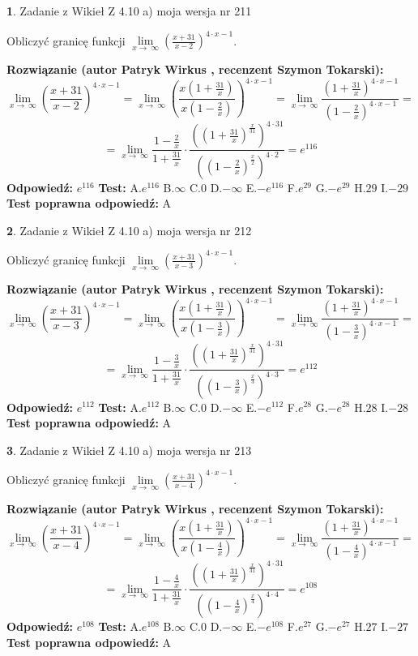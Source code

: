 \documentclass[12pt, a4paper]{article}
\theoremstyle{definition} %
\newtheorem{zad}{}
\newcommand{\zadStart}[1]{\begin{zad}#1\newline}
\newcommand{\zadStop}{\end{zad}}
\newcommand{\rozwStart}[2]{\noindent \textbf{Rozwiązanie (autor #1 , recenzent #2): }\newline}
\newcommand{\rozwStop}{\newline}
\newcommand{\odpStart}{\noindent \textbf{Odpowiedź:}\newline}
\newcommand{\odpStop}{\newline}
\newcommand{\testStart}{\noindent \textbf{Test:}\newline}
\newcommand{\testStop}{\newline}
\newcommand{\kluczStart}{\noindent \textbf{Test poprawna odpowiedź:}\newline}
\newcommand{\kluczStop}{\newline}
\begin{document}
\zadStart{Zadanie z Wikieł Z 4.10 a) moja wersja nr 211}

Obliczyć granicę funkcji  $\lim\limits_{x\to\ \infty}(\frac{x+31}{x-2})^{4\cdot x-1}$.
\zadStop
\rozwStart{Patryk Wirkus}{Szymon Tokarski}
$$\lim\limits_{x\to\ \infty}(\frac{x+31}{x-2})^{4\cdot x-1} = \lim\limits_{x\to\ \infty}(\frac{x(1+\frac{31}{x})}{x(1-\frac{2}{x})})^{4\cdot x-1}=\lim\limits_{x\to\ \infty}\frac{(1+\frac{31}{x})^{4\cdot x-1}}{(1-\frac{2}{x})^{4\cdot x-1}}=$$
$$=\lim\limits_{x\to\ \infty}\frac{1-\frac{2}{x}}{1+\frac{31}{x}}\cdot\frac{((1+\frac{31}{x})^{\frac{x}{31}})^{4\cdot31}}{((1-\frac{2}{x})^{\frac{x}{2}})^{4\cdot2}}=e^{116}$$
\rozwStop
\odpStart
$e^{116}$
\odpStop
\testStart
A.$e^{116}$ B.$\infty$ C.$0$ D.$-\infty$ E.$-e^{116}$
F.$e^{29}$ G.$-e^{29}$
H.$29$
I.$-29$
\testStop
\kluczStart
A
\kluczStop



\zadStart{Zadanie z Wikieł Z 4.10 a) moja wersja nr 212}

Obliczyć granicę funkcji  $\lim\limits_{x\to\ \infty}(\frac{x+31}{x-3})^{4\cdot x-1}$.
\zadStop
\rozwStart{Patryk Wirkus}{Szymon Tokarski}
$$\lim\limits_{x\to\ \infty}(\frac{x+31}{x-3})^{4\cdot x-1} = \lim\limits_{x\to\ \infty}(\frac{x(1+\frac{31}{x})}{x(1-\frac{3}{x})})^{4\cdot x-1}=\lim\limits_{x\to\ \infty}\frac{(1+\frac{31}{x})^{4\cdot x-1}}{(1-\frac{3}{x})^{4\cdot x-1}}=$$
$$=\lim\limits_{x\to\ \infty}\frac{1-\frac{3}{x}}{1+\frac{31}{x}}\cdot\frac{((1+\frac{31}{x})^{\frac{x}{31}})^{4\cdot31}}{((1-\frac{3}{x})^{\frac{x}{3}})^{4\cdot3}}=e^{112}$$
\rozwStop
\odpStart
$e^{112}$
\odpStop
\testStart
A.$e^{112}$ B.$\infty$ C.$0$ D.$-\infty$ E.$-e^{112}$
F.$e^{28}$ G.$-e^{28}$
H.$28$
I.$-28$
\testStop
\kluczStart
A
\kluczStop



\zadStart{Zadanie z Wikieł Z 4.10 a) moja wersja nr 213}

Obliczyć granicę funkcji  $\lim\limits_{x\to\ \infty}(\frac{x+31}{x-4})^{4\cdot x-1}$.
\zadStop
\rozwStart{Patryk Wirkus}{Szymon Tokarski}
$$\lim\limits_{x\to\ \infty}(\frac{x+31}{x-4})^{4\cdot x-1} = \lim\limits_{x\to\ \infty}(\frac{x(1+\frac{31}{x})}{x(1-\frac{4}{x})})^{4\cdot x-1}=\lim\limits_{x\to\ \infty}\frac{(1+\frac{31}{x})^{4\cdot x-1}}{(1-\frac{4}{x})^{4\cdot x-1}}=$$
$$=\lim\limits_{x\to\ \infty}\frac{1-\frac{4}{x}}{1+\frac{31}{x}}\cdot\frac{((1+\frac{31}{x})^{\frac{x}{31}})^{4\cdot31}}{((1-\frac{4}{x})^{\frac{x}{4}})^{4\cdot4}}=e^{108}$$
\rozwStop
\odpStart
$e^{108}$
\odpStop
\testStart
A.$e^{108}$ B.$\infty$ C.$0$ D.$-\infty$ E.$-e^{108}$
F.$e^{27}$ G.$-e^{27}$
H.$27$
I.$-27$
\testStop
\kluczStart
A
\kluczStop
\end{document}

